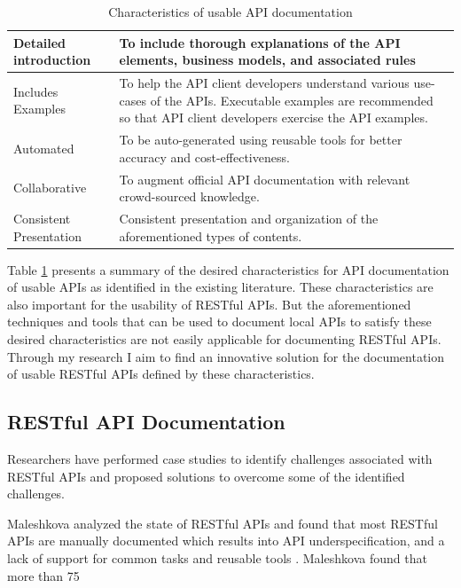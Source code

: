 \documentclass[11pt,oneside]{book}
\begin{document}
\begin{table}[!tbh]
  \caption{Characteristics of usable API documentation}
  \label{table:good_apis}
\begin{tabular}{|p{1.5in} | p{3in}|}
\hline
Detailed introduction &
To include thorough explanations of the API elements, business models, and associated rules \\
\hline
Includes Examples &
To help the API client developers understand various use-cases of the APIs. Executable examples are recommended so that API client developers exercise the API examples. \\
\hline
Automated &
To be auto-generated using reusable tools for better accuracy and cost-effectiveness. \\
\hline
Collaborative &
To augment official API documentation with relevant crowd-sourced knowledge. \\
\hline
Consistent Presentation &
Consistent presentation and organization of the aforementioned types of contents. \\
\hline
\end{tabular}
\end{table}


Table \ref{table:good_apis} presents a summary of the desired characteristics for API documentation of usable APIs as identified in the existing literature. These characteristics are also important for the usability of RESTful APIs. But the aforementioned techniques and tools that can be used to document local APIs to satisfy these desired characteristics are not easily applicable for documenting RESTful APIs. Through my research I aim to find an innovative solution for the documentation of usable RESTful APIs defined by these characteristics.

\subsection{RESTful API Documentation} %
Researchers have performed case studies to identify challenges associated with RESTful APIs and proposed solutions to overcome some of the identified challenges.

Maleshkova analyzed the state of RESTful APIs and found that most RESTful APIs are manually documented which results into API underspecification, and a lack of support for common tasks and reusable tools \cite{Maleshkova_investigating}. Maleshkova found that more than 75%
\end{document}
